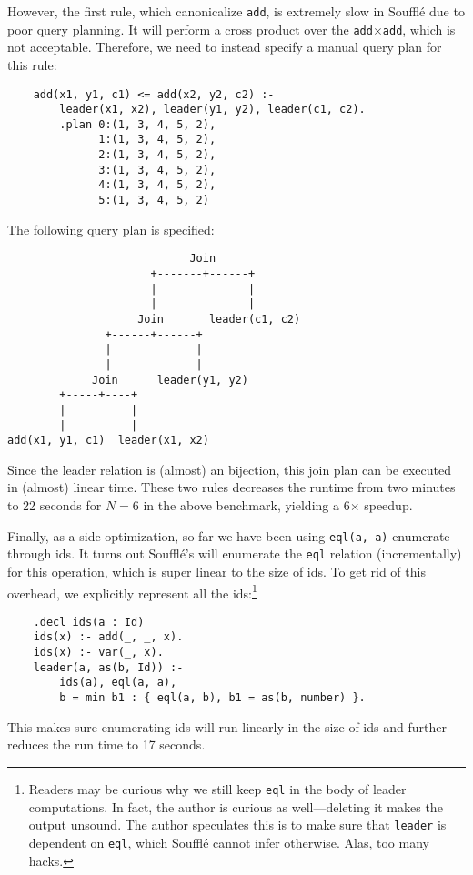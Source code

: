 However, the first rule, which canonicalize \verb|add|, 
 is extremely slow in Souffl\'e due to poor query planning.
It will perform a cross product over the \verb|add|$\times$\verb|add|,
 which is not acceptable.
Therefore, we need to instead specify a manual query plan for this rule:
\begin{verbatim}
    add(x1, y1, c1) <= add(x2, y2, c2) :-
        leader(x1, x2), leader(y1, y2), leader(c1, c2).
        .plan 0:(1, 3, 4, 5, 2), 
              1:(1, 3, 4, 5, 2), 
              2:(1, 3, 4, 5, 2), 
              3:(1, 3, 4, 5, 2), 
              4:(1, 3, 4, 5, 2), 
              5:(1, 3, 4, 5, 2)
\end{verbatim}
The following query plan is specified:
\begin{verbatim}
                            Join
                      +-------+------+
                      |              |
                      |              |
                    Join       leader(c1, c2)
               +------+------+
               |             |
               |             |
             Join      leader(y1, y2)
        +-----+----+
        |          |
        |          |
add(x1, y1, c1)  leader(x1, x2)
\end{verbatim}
Since the leader relation is (almost) an bijection,
 this join plan can be executed in (almost) linear time.
These two rules decreases the runtime from two minutes 
 to 22 seconds for $N=6$ in the above benchmark, 
 yielding a 6$\times$ speedup.

Finally, as a side optimization, 
 so far we have been using \verb|eql(a, a)| 
 enumerate through \eclass ids.
It turns out Souffl\'e's \eqrel{} will 
 enumerate the \verb|eql| relation (incrementally)
 for this operation, which is super linear to
 the size of \eclass ids.
To get rid of this overhead,
 we explicitly represent all the ids:\footnote{
     Readers may be curious why we still keep \texttt{eql} in the body
     of leader computations.
     In fact, the author is curious as well---deleting it
     makes the output unsound. 
     The author speculates this is to make sure that
     \texttt{leader} is dependent on \texttt{eql}, 
     which Souffl\'e cannot infer otherwise.
     Alas, too many hacks.}
\begin{verbatim}
    .decl ids(a : Id)
    ids(x) :- add(_, _, x).
    ids(x) :- var(_, x).
    leader(a, as(b, Id)) :- 
        ids(a), eql(a, a), 
        b = min b1 : { eql(a, b), b1 = as(b, number) }.
\end{verbatim}
This makes sure enumerating ids will run linearly in the size of \eclass
 ids and further reduces the run time to 17 seconds.

